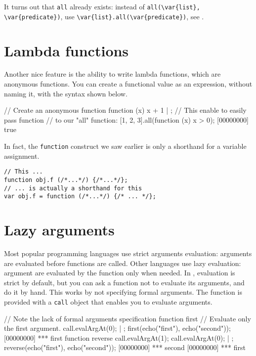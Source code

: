 It turns out that \lstinline|all| already exists: instead of
\lstinline|all(\var{list}, \var{predicate})|, use
\lstinline|\var{list}.all(\var{predicate})|, see
.

\section{Lambda functions}

Another nice feature is the ability to write lambda functions, which
are anonymous functions. You can create a functional value as an
expression, without naming it, with the syntax shown below.

\begin{urbiscript}
// Create an anonymous function
function (x) {x + 1} | {};
// This enable to easily pass function
// to our "all" function:
[1, 2, 3].all(function (x) { x > 0});
[00000000] true
\end{urbiscript}

In fact, the \lstinline{function} construct we saw earlier is only a
shorthand for a variable assignment.

\begin{verbatim}
// This ...
function obj.f (/*...*/) {/*...*/};
// ... is actually a shorthand for this
var obj.f = function (/*...*/) {/* ... */};
\end{verbatim}

\section{Lazy arguments}

Most popular programming languages use strict arguments evaluation:
arguments are evaluated before functions are called. Other languages
use lazy evaluation: argument are evaluated by the function only when
needed. In \us, evaluation is strict by default, but you can ask a
function not to evaluate its arguments, and do it by hand. This works
by not specifying formal arguments. The function is provided with a
\lstinline{call} object that enables you to evaluate arguments.

\begin{urbiscript}
// Note the lack of formal arguments specification
function first
{
  // Evaluate only the first argument.
  call.evalArgAt(0);
} | {};
first(echo("first"), echo("second"));
[00000000] *** first
function reverse
{
  call.evalArgAt(1);
  call.evalArgAt(0);
} | {};
reverse(echo("first"), echo("second"));
[00000000] *** second
[00000000] *** first
\end{urbiscript}

